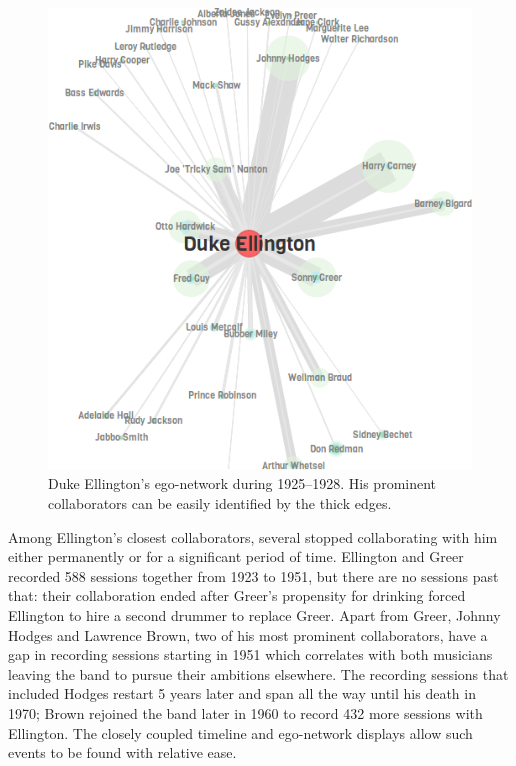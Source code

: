 \documentclass[12pt]{cmuthesis}
\begin{document}
  \begin{figure}[ht]
    \includegraphics[width=\linewidth]{duke-ellington-1925-1928}
    \caption{Duke Ellington's ego-network during 1925--1928. His prominent
  collaborators can be easily identified by the thick edges.}
    \label{fig:duke-ell}
  \end{figure}


  Among Ellington's closest collaborators, several stopped collaborating with him
  either permanently or for a significant period of time. Ellington and Greer
  recorded 588 sessions together from 1923 to 1951, but there are no sessions
  past that: their collaboration ended after Greer's propensity for drinking
  forced Ellington to hire a second drummer to replace Greer. Apart from Greer,
  Johnny Hodges and Lawrence Brown, two of his most prominent collaborators, have
  a gap in recording sessions starting in 1951 which correlates with both
  musicians leaving the band to pursue their ambitions elsewhere. The recording
  sessions that included Hodges restart 5 years later and span all the way until
  his death in 1970; Brown rejoined the band later in 1960 to record 432 more
  sessions with Ellington.  The closely coupled timeline and ego-network displays
  allow such events to be found with relative ease.
\end{document}
